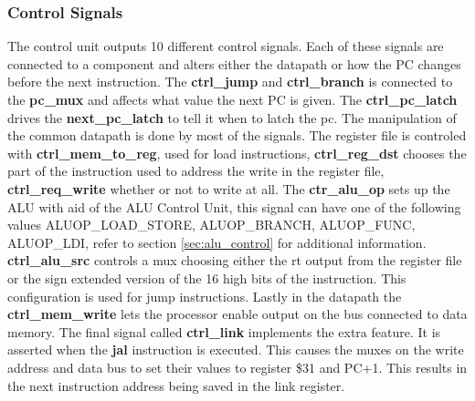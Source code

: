 \subsubsection{Control Signals}

The control unit outputs 10 different control signals. Each of these signals are connected to a component and alters either the datapath
or how the PC changes before the next instruction. The {\bf ctrl\_jump} and {\bf ctrl\_branch} is connected to the {\bf pc\_mux} and 
affects what value the next PC is given. The {\bf ctrl\_pc\_latch} drives the {\bf next\_pc\_latch} to tell it when to latch the pc. 
The manipulation of the common datapath is done by most of the signals. The register file is controled with {\bf ctrl\_mem\_to\_reg}, 
used for load instructions, {\bf ctrl\_reg\_dst} chooses the part of the instruction used to address the write in the register file, 
{\bf ctrl\_req\_write} whether or not to write at all. The {\bf ctr\_alu\_op} sets up the ALU with aid of the ALU Control Unit, this
signal can have one of the following values ALUOP\_LOAD\_STORE, ALUOP\_BRANCH, ALUOP\_FUNC, ALUOP\_LDI, refer to section \ref{sec:alu_control} for additional information.
{\bf ctrl\_alu\_src} controls a mux choosing either the rt output from the register file or the sign extended version of the 16 high
bits of the instruction. This configuration is used for jump instructions. Lastly in the datapath the {\bf ctrl\_mem\_write} lets the
processor enable output on the bus connected to data memory. The final signal called {\bf ctrl\_link} implements the extra feature. 
It is asserted when the {\bf jal} instruction is executed. This causes the muxes on the write address and data bus to set their values
to register \$31 and PC+1. This results in the next instruction address being saved in the link register.
